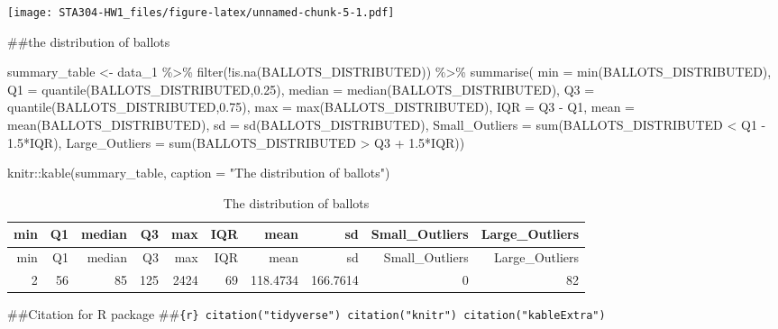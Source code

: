 \documentclass[
]{article}
\newenvironment{Shaded}{\begin{snugshade}}{\end{snugshade}}
\newcommand{\AttributeTok}[1]{\textcolor[rgb]{0.77,0.63,0.00}{#1}}
\newcommand{\FloatTok}[1]{\textcolor[rgb]{0.00,0.00,0.81}{#1}}
\newcommand{\FunctionTok}[1]{\textcolor[rgb]{0.00,0.00,0.00}{#1}}
\newcommand{\NormalTok}[1]{#1}
\newcommand{\OtherTok}[1]{\textcolor[rgb]{0.56,0.35,0.01}{#1}}
\newcommand{\SpecialCharTok}[1]{\textcolor[rgb]{0.00,0.00,0.00}{#1}}
\newcommand{\StringTok}[1]{\textcolor[rgb]{0.31,0.60,0.02}{#1}}
\begin{document}
\texttt{[image: STA304-HW1\_files/figure-latex/unnamed-chunk-5-1.pdf]}

\#\#the distribution of ballots

\begin{Shaded}
\begin{Highlighting}[]
\NormalTok{summary\_table }\OtherTok{\textless{}{-}}\NormalTok{ data\_1 }\SpecialCharTok{\%\textgreater{}\%} \FunctionTok{filter}\NormalTok{(}\SpecialCharTok{!}\FunctionTok{is.na}\NormalTok{(BALLOTS\_DISTRIBUTED)) }\SpecialCharTok{\%\textgreater{}\%} \FunctionTok{summarise}\NormalTok{(}
                                  \AttributeTok{min =} \FunctionTok{min}\NormalTok{(BALLOTS\_DISTRIBUTED),}
                                  \AttributeTok{Q1 =} \FunctionTok{quantile}\NormalTok{(BALLOTS\_DISTRIBUTED,}\FloatTok{0.25}\NormalTok{),}
                                  \AttributeTok{median =} \FunctionTok{median}\NormalTok{(BALLOTS\_DISTRIBUTED),}
                                  \AttributeTok{Q3 =} \FunctionTok{quantile}\NormalTok{(BALLOTS\_DISTRIBUTED,}\FloatTok{0.75}\NormalTok{),}
                                  \AttributeTok{max =} \FunctionTok{max}\NormalTok{(BALLOTS\_DISTRIBUTED),}
                                  \AttributeTok{IQR =}\NormalTok{ Q3 }\SpecialCharTok{{-}}\NormalTok{ Q1,}
                                  \AttributeTok{mean =} \FunctionTok{mean}\NormalTok{(BALLOTS\_DISTRIBUTED), }
                                  \AttributeTok{sd =} \FunctionTok{sd}\NormalTok{(BALLOTS\_DISTRIBUTED), }
                                  \AttributeTok{Small\_Outliers =} \FunctionTok{sum}\NormalTok{(BALLOTS\_DISTRIBUTED }\SpecialCharTok{\textless{}}\NormalTok{ Q1 }\SpecialCharTok{{-}} \FloatTok{1.5}\SpecialCharTok{*}\NormalTok{IQR),}
                                  \AttributeTok{Large\_Outliers =} \FunctionTok{sum}\NormalTok{(BALLOTS\_DISTRIBUTED }\SpecialCharTok{\textgreater{}}\NormalTok{ Q3 }\SpecialCharTok{+} \FloatTok{1.5}\SpecialCharTok{*}\NormalTok{IQR)) }

\NormalTok{knitr}\SpecialCharTok{::}\FunctionTok{kable}\NormalTok{(summary\_table, }\AttributeTok{caption =} \StringTok{"The distribution of ballots"}\NormalTok{)}
\end{Highlighting}
\end{Shaded}

\begin{longtable}[]{@{}rrrrrrrrrr@{}}
\caption{The distribution of ballots}\tabularnewline
\toprule
min & Q1 & median & Q3 & max & IQR & mean & sd & Small\_Outliers &
Large\_Outliers \\
\midrule
\endfirsthead
\toprule
min & Q1 & median & Q3 & max & IQR & mean & sd & Small\_Outliers &
Large\_Outliers \\
\midrule
\endhead
2 & 56 & 85 & 125 & 2424 & 69 & 118.4734 & 166.7614 & 0 & 82 \\
\bottomrule
\end{longtable}

\#\#Citation for R package
\#\#\texttt{\{r\}\ citation("tidyverse")\ citation("knitr")\ citation("kableExtra")}
\end{document}
